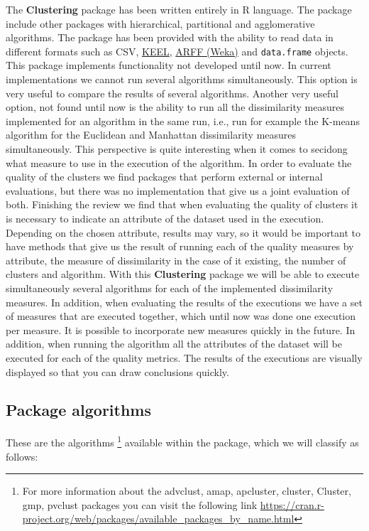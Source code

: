 \documentclass[
]{article}
\begin{document}
The \textbf{Clustering} package has been written entirely in R language.
The package include other packages with hierarchical, partitional and
agglomerative algorithms. The package has been provided with the ability
to read data in different formats such as CSV,
\href{https://sci2s.ugr.es/keel/references.php}{KEEL},
\href{https://www.cs.waikato.ac.nz/ml/weka/}{ARFF (Weka)} and
\texttt{data.frame} objects. This package implements functionality not
developed until now. In current implementations we cannot run several
algorithms simultaneously. This option is very useful to compare the
results of several algorithms. Another very useful option, not found
until now is the ability to run all the dissimilarity measures
implemented for an algorithm in the same run, i.e., run for example the
K-means algorithm for the Euclidean and Manhattan dissimilarity measures
simultaneously. This perspective is quite interesting when it comes to
secidong what measure to use in the execution of the algorithm. In order
to evaluate the quality of the clusters we find packages that perform
external or internal evaluations, but there was no implementation that
give us a joint evaluation of both. Finishing the review we find that
when evaluating the quality of clusters it is necessary to indicate an
attribute of the dataset used in the execution. Depending on the chosen
attribute, results may vary, so it would be important to have methods
that give us the result of running each of the quality measures by
attribute, the measure of dissimilarity in the case of it existing, the
number of clusters and algorithm. With this \textbf{Clustering} package
we will be able to execute simultaneously several algorithms for each of
the implemented dissimilarity measures. In addition, when evaluating the
results of the executions we have a set of measures that are executed
together, which until now was done one execution per measure. It is
possible to incorporate new measures quickly in the future. In addition,
when running the algorithm all the attributes of the dataset will be
executed for each of the quality metrics. The results of the executions
are visually displayed so that you can draw conclusions quickly.

\hypertarget{package-algorithms}{%
\subsection{Package algorithms}\label{package-algorithms}}

These are the algorithms
\footnote{For more information about the advclust, amap, apcluster, cluster, Cluster, gmp, pvclust packages you can visit the following link \url{https://cran.r-project.org/web/packages/available_packages_by_name.html}}
available within the package, which we will classify as follows:
\end{document}
